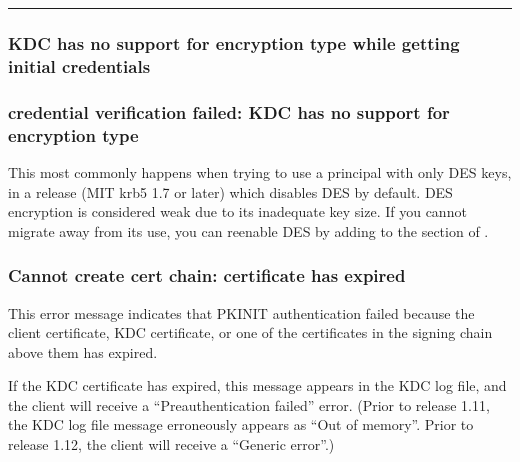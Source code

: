 \documentclass[letterpaper,10pt,english]{sphinxmanual}
\begin{document}
\bigskip\hrule\bigskip



\subsubsection{KDC has no support for encryption type while getting initial credentials}
\label{\detokenize{admin/troubleshoot:kdc-has-no-support-for-encryption-type-while-getting-initial-credentials}}\label{\detokenize{admin/troubleshoot:init-creds-etype-nosupp}}

\subsubsection{credential verification failed: KDC has no support for encryption type}
\label{\detokenize{admin/troubleshoot:credential-verification-failed-kdc-has-no-support-for-encryption-type}}\label{\detokenize{admin/troubleshoot:cert-chain-etype-nosupp}}
\sphinxAtStartPar
This most commonly happens when trying to use a principal with only
DES keys, in a release (MIT krb5 1.7 or later) which disables DES by
default.  DES encryption is considered weak due to its inadequate key
size.  If you cannot migrate away from its use, you can re\sphinxhyphen{}enable DES
by adding  to the {\hyperref[\detokenize{admin/conf_files/krb5_conf:libdefaults}]{}}
section of {\hyperref[\detokenize{admin/conf_files/krb5_conf:krb5-conf-5}]{}}.


\subsubsection{Cannot create cert chain: certificate has expired}
\label{\detokenize{admin/troubleshoot:cannot-create-cert-chain-certificate-has-expired}}\label{\detokenize{admin/troubleshoot:err-cert-chain-cert-expired}}
\sphinxAtStartPar
This error message indicates that PKINIT authentication failed because
the client certificate, KDC certificate, or one of the certificates in
the signing chain above them has expired.

\sphinxAtStartPar
If the KDC certificate has expired, this message appears in the KDC
log file, and the client will receive a “Preauthentication failed”
error.  (Prior to release 1.11, the KDC log file message erroneously
appears as “Out of memory”.  Prior to release 1.12, the client will
receive a “Generic error”.)
\end{document}
